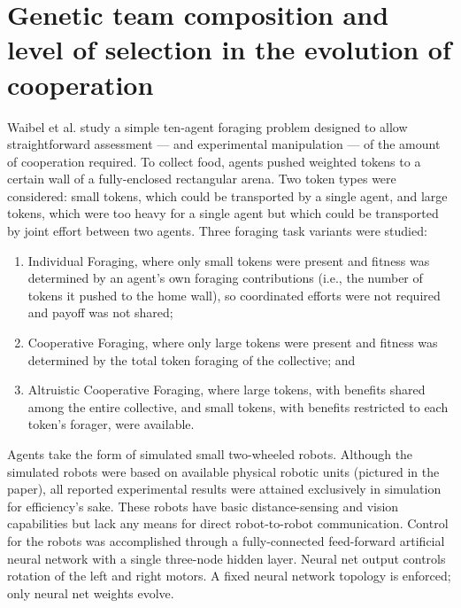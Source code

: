 \section{Genetic team composition and level of selection in the evolution of cooperation \cite{waibel2009genetic}}

Waibel et al. study a simple ten-agent foraging problem designed to allow straightforward assessment --- and experimental manipulation --- of the amount of cooperation required.
To collect food, agents pushed weighted tokens to a certain wall of a fully-enclosed rectangular arena.
Two token types were considered: small tokens, which could be transported by a single agent, and large tokens, which were too heavy for a single agent but which could be transported by joint effort between two agents.
Three foraging task variants were studied:
\begin{enumerate}
\item Individual Foraging, where only small tokens were present and fitness was determined by an agent's own foraging contributions (i.e., the number of tokens it pushed to the home wall), so coordinated efforts were not required and payoff was not shared;
\item Cooperative Foraging, where only large tokens were present and fitness was determined by the total token foraging of the collective; and
\item Altruistic Cooperative Foraging, where large tokens, with benefits shared among the entire collective, and small tokens, with benefits restricted to each token's forager, were available.
\end{enumerate}

Agents take the form of simulated small two-wheeled robots.
Although the simulated robots were based on available physical robotic units (pictured in the paper), all reported experimental results were attained exclusively in simulation for efficiency's sake.
These robots have basic distance-sensing and vision capabilities but lack any means for direct robot-to-robot communication.
Control for the robots was accomplished through a fully-connected feed-forward artificial neural network with a single three-node hidden layer.
Neural net output controls rotation of the left and right motors.
A fixed neural network topology is enforced; only neural net weights evolve.

